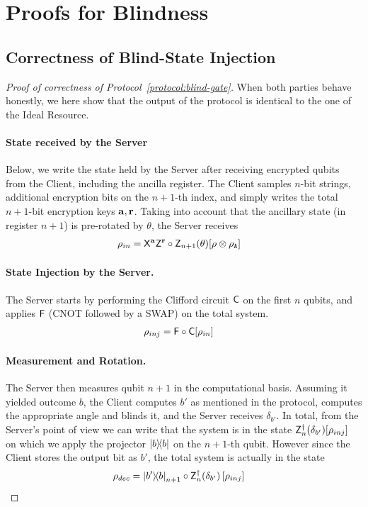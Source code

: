 
\section{Proofs for Blindness}
\subsection{Correctness of Blind-State Injection}
\label{appendix: correctness of blind-gate}
\begin{proof}[Proof of correctness of Protocol~\ref{protocol:blind-gate}]
    When both parties behave honestly, we here show that the output of the protocol is identical to the one of the Ideal Resource.
    \paragraph{State received by the Server}
    Below, we write the state held by the Server after receiving encrypted qubits from the Client, including the ancilla register. The Client samples $n$-bit strings, additional encryption bits on the $n+1$-th index, and simply writes the total $n+1$-bit encryption keys $\mathbf a, \mathbf r$.
    Taking into account that the ancillary state (in register $n+1$) is pre-rotated by $\theta$, the Server receives
    \begin{align}
        \rho_{in}
        &=
        \mathsf{X}^{\mathbf a}
        \mathsf{Z}^{\mathbf r}
        \circ
        \mathsf{Z}_{n+1}(\theta)
        [
            \rho\otimes \rho_{\mathtt{A}}
        ]
    \end{align}
    \paragraph{State Injection by the Server.}
    The Server starts by performing the Clifford circuit $\mathsf{C}$ on the first $n$ qubits, and applies $\mathsf{F}$ (CNOT followed by a SWAP) on the total system.
    \begin{align}
        \rho_{inj} &=
        \mathsf{F}
            \circ
            \mathsf{C}
            [
                \rho_{in}
            ]
    \end{align}

    \paragraph{Measurement and Rotation.}
    The Server then measures qubit $n+1$ in the computational basis. Assuming it yielded outcome $b$, the Client computes $b'$ as mentioned in the protocol, computes the appropriate angle and blinds it, and the Server receives $\delta_{b'}$. In total, from the Server's point of view we can write that the system is in the state $\mathsf{Z}^{\dagger}_n(\delta_{b'})[\rho_{inj}]$ on which we apply the projector $\ketbra b$ on the $n+1$-th qubit. However since the Client stores the output bit as $b'$, the total system is actually in the state
    \begin{align}
        \rho_{dec}
        &=
        \ketbra{b'}{b}_{n+1}
        \circ
        \mathsf{Z}_n^\dagger(\delta_{b'})
        \left[
            \rho_{inj}
            \right]
        \end{align}


\end{proof}
